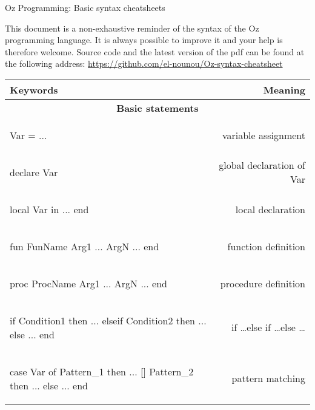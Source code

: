 \documentclass[12pt]{article}
\author{Felten Florian}
\begin{document}
\vspace*{2em}
\begin{center} %
	{\Large Oz Programming: Basic syntax cheatsheets}
\end{center}

This document is a non-exhaustive reminder of the syntax of the Oz programming language. It is always possible to improve it and your help is therefore welcome. Source code and the latest version of the pdf can be found at the following address: \url{https://github.com/el-nounou/Oz-syntax-cheatsheet}

\begin{longtable}{l r}
\toprule[0.2em]
\multicolumn{1}{l}{\textbf{Keywords}} & \textbf{Meaning}\\
\midrule


\multicolumn{2}{c}{\textbf{Basic statements}}\\

\begin{oz}
Var = ...
\end{oz}
&variable assignment\\

\begin{oz}
declare Var 
\end{oz}
&global declaration of Var\\
 
\begin{oz}
local Var in 
	...
end
\end{oz}
&local declaration\\
 
 
\begin{oz}
fun {FunName Arg1 ... ArgN}
	...
end
\end{oz}
&function definition\\
 
\begin{oz}
proc {ProcName Arg1 ... ArgN}
	...
end
\end{oz}
&procedure definition\\

\begin{oz}
if Condition1 then
	...
elseif Condition2 then 
	...
else
	...
end
\end{oz}
&if \dots else if \dots else \dots \\
 
 
\begin{oz}
case Var of Pattern_1 then ...
[] Pattern_2 then ...
else ...
end
\end{oz}
&pattern matching \\[0.4em]




\end{longtable}
\end{document}
